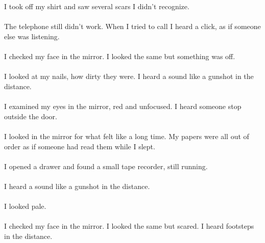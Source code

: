\documentclass{article}
\begin{document}
    \section{}
    I took off my shirt and saw several scars I didn't recognize. \\\\The telephone still didn't work. When I tried to call I heard a click, as if someone else was listening. \\\\I checked my face in the mirror. I looked the same but something was off. \\\\I looked at my nails, how dirty they were. I heard a sound like a gunshot in the distance. \\\\I examined my eyes in the mirror, red and unfocused. I heard someone stop outside the door. \\\\I looked in the mirror for what felt like a long time. My papers were all out of order as if someone had read them while I slept. \\\\I opened a drawer and found a small tape recorder, still running. \\\\I heard a sound like a gunshot in the distance. \\\\I looked pale. \\\\I checked my face in the mirror. I looked the same but scared. I heard footsteps in the distance. \\\\
    \newpage
    
\end{document}
